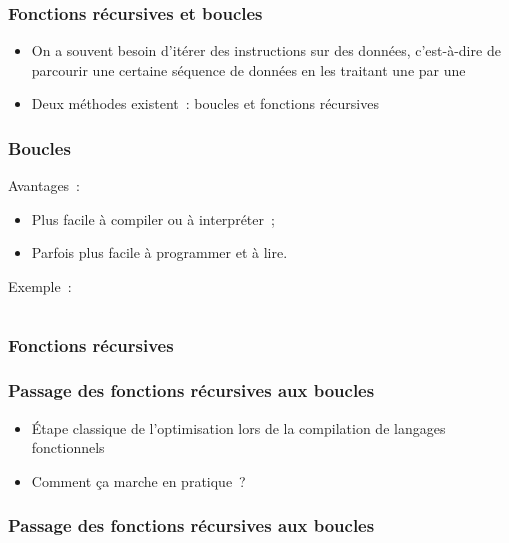 

\begin{frame}
    \frametitle{Fonctions récursives et boucles}

    \begin{itemize}
        \item On a souvent besoin d’itérer des instructions sur des données,
            c’est-à-dire de parcourir une certaine séquence de données en les
            traitant une par une
        \pause
        \item Deux méthodes existent~: boucles et fonctions récursives
    \end{itemize}
\end{frame}

\begin{frame}
    \frametitle{Boucles}

    Avantages~:
    \pause
    \begin{itemize}
        \item Plus facile à compiler ou à interpréter~;
        \pause
        \item Parfois plus facile à programmer et à lire.
    \end{itemize}

    \pause
    Exemple~:
    \inputminted{ocaml}{exemples/intro/somme_liste_boucle.ml}
\end{frame}

\begin{frame}
    \frametitle{Fonctions récursives}





\end{frame}


\begin{frame}
    \frametitle{Passage des fonctions récursives aux boucles}

    \begin{itemize}
        \pause
        \item Étape classique de l’optimisation lors de la compilation de
            langages fonctionnels
        \pause
        \item Comment ça marche en pratique~?
    \end{itemize}
\end{frame}


\begin{frame}
    \frametitle{Passage des fonctions récursives aux boucles}

    
\end{frame}
